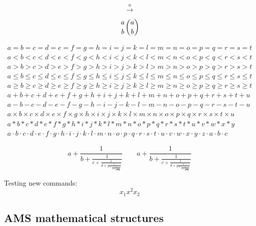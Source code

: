 \documentclass[12pt,a4paper]{article}
\theoremstyle{clearprint}
\newcommand{\xsb}{x_{1}}
\newcommand{\xsp}{x^{2}}
\newcommand{\xsbnum}[1]{x_{#1}}
\begin{document}
\noindent 
\[
\stackrel{a}{\longrightarrow}
\]

\noindent
\[
{a \atop b} {a \choose b}
\]

\noindent
\begin{eqnarray*}
a = b = c = d = e = f = g = h = i = j = k = l = m = n = o = p = q = r = s = t\\
a < b < c < d < e < f < g < h < i < j < k < l < m < n < o < p < q < r < s < t\\
a > b > c > d > e > f > g > h > i > j > k > l > m > n > o > p > q > r > s > t\\
a \leq b \leq c \leq d \leq e \leq f \leq g \leq h \leq i \leq j \leq k \leq l \leq m \leq n \leq o \leq p \leq q \leq r \leq s \leq t\\
a \geq b \geq c \geq d \geq e \geq f \geq g \geq h \geq i \geq j \geq k \geq l \geq m \geq n \geq o \geq p \geq q \geq r \geq s \geq t\\
a + b + c + d + e + f + g + h + i + j + k + l + m + n + o + p + q + r + s + t + u\\
a - b - c - d - e - f - g - h - i - j - k - l - m - n - o - p - q - r - s - t - u\\
a \times b \times c \times d \times e \times f \times g \times h \times i \times j \times k \times l \times m \times n \times o \times p \times q \times r \times s \times t \times u\\
a * b * c * d * e * f * g * h * i * j * k * l * m * n * o * p * q * r * s * t * u * v * w * x * y\\
a \cdot b \cdot c \cdot d \cdot e \cdot f \cdot g \cdot h \cdot i \cdot j \cdot k \cdot l \cdot m \cdot n \cdot o \cdot p \cdot q \cdot r \cdot s \cdot t \cdot u \cdot v \cdot w \cdot x \cdot y \cdot z \cdot a \cdot b \cdot c
\end{eqnarray*}


\noindent
\[
{a + \frac{1}{b + \frac{1}{c + \frac{1}{d + \frac{1}{e + \frac{1}{f + \frac{1}{g + \frac{1}{h}}}}}}}} \qquad {a + \frac{1}{\displaystyle b + \frac{1}{\displaystyle c + \frac{1}{\displaystyle d + \frac{1}{\displaystyle e + \frac{1}{\displaystyle f + \frac{1}{\displaystyle g + \frac{1}{h}}}}}}}}
\]

\noindent
Testing new commands:
\[ 
\xsb \xsp \xsbnum{2}
\]


\subsection[AMS maths structures]{AMS mathematical structures}
\setcounter{equation}{0}
\end{document}
